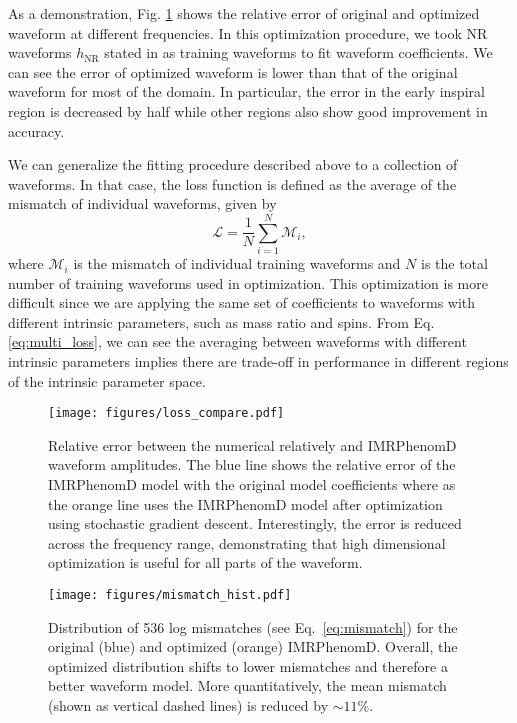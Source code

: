 \documentclass[twocolumn]{aastex631}
\begin{document}
As a demonstration, Fig. \ref{fig:loss_compare} shows the relative error of
original and optimized waveform at different frequencies. In this optimization
procedure, we took NR waveforms $h_{\mathrm{NR}}$ stated in \citep{Khan:2015jqa}
as training waveforms to fit waveform coefficients.   
We can see the error of optimized waveform is lower than that of the original waveform for most of the domain.
In particular, the error in the early inspiral region is decreased by half while other regions also show good improvement in accuracy. 

We can generalize the fitting procedure described above to a collection of waveforms.
In that case, the loss function is defined as the average of the mismatch of
individual waveforms, given by
\begin{equation}
	\mathcal{L}=\frac{1}{N}\sum_{i=1}^{N}\mathcal{M}_i,
    \label{eq:multi_loss}
\end{equation}
where $\mathcal{M}_i$ is the mismatch of individual training waveforms and $N$
is the total number of training waveforms used in optimization. This
optimization is more difficult since we are applying the same set of
coefficients to waveforms with different intrinsic parameters, such as mass
ratio and spins. From Eq. \ref{eq:multi_loss}, we can see the averaging between
waveforms with different intrinsic parameters implies there are trade-off in
performance in different regions of the intrinsic parameter space.

\begin{figure}[t]
	\begin{centering}
		\texttt{[image: figures/loss\_compare.pdf]}
		\caption{
			Relative error between the numerical relatively and IMRPhenomD waveform amplitudes. 
            The blue line shows the relative error of the IMRPhenomD model with the original model coefficients where as the orange line uses the IMRPhenomD model after optimization using stochastic gradient descent.
            Interestingly, the error is reduced across the frequency range, demonstrating that high dimensional optimization is useful for all parts of the waveform.
		}
		\label{fig:loss_compare}
	\end{centering}
\end{figure}

\begin{figure}[t]
	\begin{centering}
		\texttt{[image: figures/mismatch\_hist.pdf]}
		\caption{
			Distribution of 536 log mismatches (see Eq.~\ref{eq:mismatch}) for the original (blue) and optimized (orange) IMRPhenomD. 
            Overall, the optimized distribution shifts to lower mismatches and therefore a better waveform model. 
            More quantitatively, the mean mismatch (shown as vertical dashed lines) is reduced by $\sim11$\%.
		}
		\label{fig:mismatch_hist}
	\end{centering}
\end{figure}
 
\end{document}
